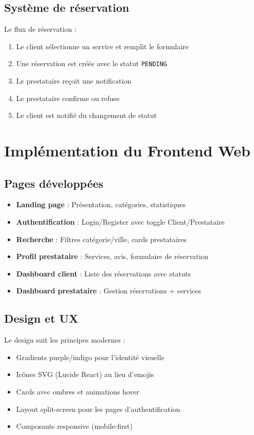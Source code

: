\documentclass[12pt,a4paper]{report}
\begin{document}
\subsection{Système de réservation}
Le flux de réservation :
\begin{enumerate}
  \item Le client sélectionne un service et remplit le formulaire
  \item Une réservation est créée avec le statut \texttt{PENDING}
  \item Le prestataire reçoit une notification
  \item Le prestataire confirme ou refuse
  \item Le client est notifié du changement de statut
\end{enumerate}

\section{Implémentation du Frontend Web}

\subsection{Pages développées}
\begin{itemize}
  \item \textbf{Landing page} : Présentation, catégories, statistiques
  \item \textbf{Authentification} : Login/Register avec toggle Client/Prestataire
  \item \textbf{Recherche} : Filtres catégorie/ville, cards prestataires
  \item \textbf{Profil prestataire} : Services, avis, formulaire de réservation
  \item \textbf{Dashboard client} : Liste des réservations avec statuts
  \item \textbf{Dashboard prestataire} : Gestion réservations + services
\end{itemize}

\subsection{Design et UX}
Le design suit les principes modernes :
\begin{itemize}
  \item Gradients purple/indigo pour l'identité visuelle
  \item Icônes SVG (Lucide React) au lieu d'emojis
  \item Cards avec ombres et animations hover
  \item Layout split-screen pour les pages d'authentification
  \item Composants responsive (mobile-first)
\end{itemize}
\end{document}

